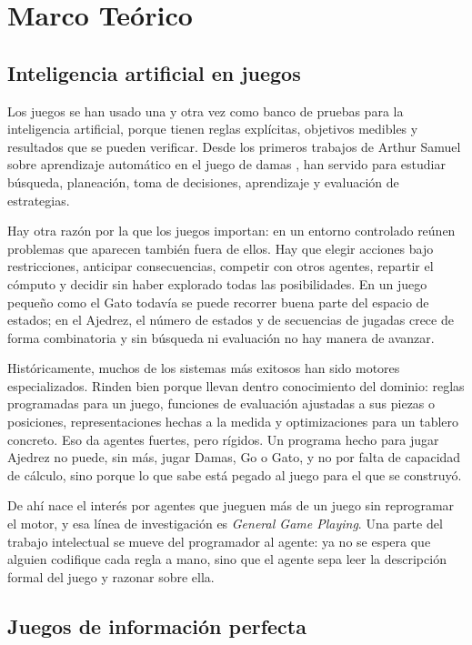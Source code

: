 \chapter{Marco Teórico}
\label{ch:marco_teorico}

\section{Inteligencia artificial en juegos}

Los juegos se han usado una y otra vez como banco de pruebas para la inteligencia artificial, porque tienen reglas explícitas, objetivos medibles y resultados que se pueden verificar. Desde los primeros trabajos de Arthur Samuel sobre aprendizaje automático en el juego de damas \cite{Samuel1959}, han servido para estudiar búsqueda, planeación, toma de decisiones, aprendizaje y evaluación de estrategias.

Hay otra razón por la que los juegos importan: en un entorno controlado reúnen problemas que aparecen también fuera de ellos. Hay que elegir acciones bajo restricciones, anticipar consecuencias, competir con otros agentes, repartir el cómputo y decidir sin haber explorado todas las posibilidades. En un juego pequeño como el Gato todavía se puede recorrer buena parte del espacio de estados; en el Ajedrez, el número de estados y de secuencias de jugadas crece de forma combinatoria y sin búsqueda ni evaluación no hay manera de avanzar.

Históricamente, muchos de los sistemas más exitosos han sido motores especializados. Rinden bien porque llevan dentro conocimiento del dominio: reglas programadas para un juego, funciones de evaluación ajustadas a sus piezas o posiciones, representaciones hechas a la medida y optimizaciones para un tablero concreto. Eso da agentes fuertes, pero rígidos. Un programa hecho para jugar Ajedrez no puede, sin más, jugar Damas, Go o Gato, y no por falta de capacidad de cálculo, sino porque lo que sabe está pegado al juego para el que se construyó.

De ahí nace el interés por agentes que jueguen más de un juego sin reprogramar el motor, y esa línea de investigación es \textit{General Game Playing}. Una parte del trabajo intelectual se mueve del programador al agente: ya no se espera que alguien codifique cada regla a mano, sino que el agente sepa leer la descripción formal del juego y razonar sobre ella.

\section{Juegos de información perfecta}


